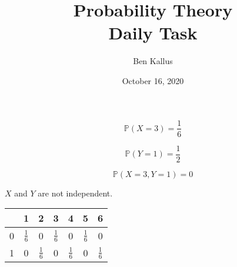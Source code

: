 \documentclass[12pt]{article}
\title{Probability Theory \\ Daily Task}
\author{Ben Kallus}
\date{October 16, 2020}
\begin{document}
\maketitle

 $$\mathbb P(X=3) = \frac16$$

 $$\mathbb P(Y=1) = \frac12$$

 $$\mathbb P(X = 3, Y = 1) = 0$$

 $X$ and $Y$ are not independent.


\begin{tabular}{| c | c c c c c c |}
    \hline
      & 1 & 2 & 3 & 4 & 5 & 6 \\
    \hline
    0 & $\frac16$ & 0 & $\frac16$ & 0 & $\frac16$ & 0 \\
    1 & 0 & $\frac16$ & 0 & $\frac16$ & 0 & $\frac16$ \\
    \hline
\end{tabular}
\end{document}
